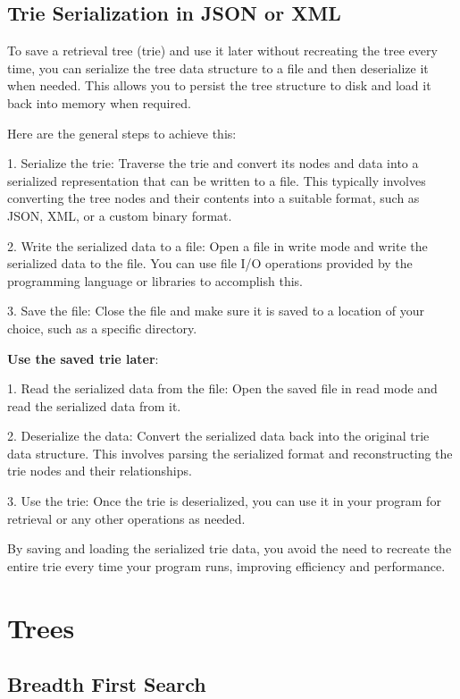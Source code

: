 \subsection{Trie Serialization in JSON or XML}

To save a retrieval tree (trie) and use it later without recreating the tree every time,
you can serialize the tree data structure to a file and then deserialize it when needed.
This allows you to persist the tree structure to disk and load it back into memory when required.

Here are the general steps to achieve this:

1. Serialize the trie: Traverse the trie and convert its nodes and data
into a serialized representation that can be written to a file.
This typically involves converting the tree nodes and their contents into
a suitable format, such as JSON, XML, or a custom binary format.

2. Write the serialized data to a file:
Open a file in write mode and write the serialized data to the file.
You can use file I/O operations provided by the programming language or libraries to accomplish this.

3. Save the file: Close the file and make sure it is saved to a location of your choice,
such as a specific directory.

\textbf{Use the saved trie later}:

1. Read the serialized data from the file:
Open the saved file in read mode and read the serialized data from it.

2. Deserialize the data: Convert the serialized data back into the original trie data structure.
This involves parsing the serialized format and reconstructing the trie nodes and their relationships.

3. Use the trie: Once the trie is deserialized,
you can use it in your program for retrieval or any other operations as needed.

By saving and loading the serialized trie data,
you avoid the need to recreate the entire trie every time your program runs,
improving efficiency and performance.


\section{Trees}

\subsection{Breadth First Search}


